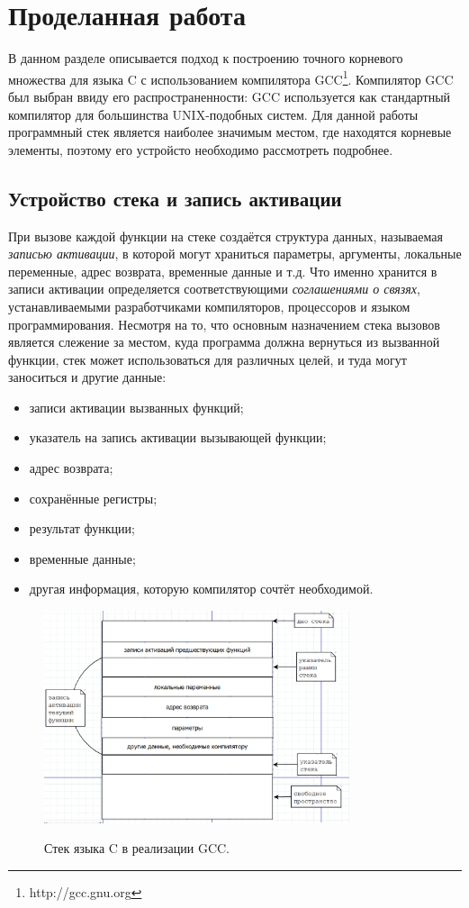 \documentclass{matmex-diploma}
\begin{document}
\section{Проделанная работа}
В данном разделе описывается подход к построению точного корневого множества для языка C с использованием компилятора GCC\footnote{http://gcc.gnu.org}. Компилятор GCC был выбран ввиду его распространенности: GCC используется как стандартный компилятор для большинства UNIX-подобных систем. Для данной работы программный стек является наиболее значимым местом, где находятся корневые элементы, поэтому его устройсто необходимо рассмотреть подробнее.\\

\subsection{Устройство стека и запись активации}
При вызове каждой функции на стеке создаётся структура данных, называемая \textit{записью активации}, в которой могут храниться параметры, аргументы, локальные переменные, адрес возврата, временные данные и т.д. Что именно хранится в записи активации определяется соответствующими \textit{соглашениями о связях}, устанавливаемыми разработчиками компиляторов, процессоров и языком программирования. Несмотря на то, что основным назначением стека вызовов является слежение за местом, куда программа должна вернуться из вызванной функции, стек может использоваться для различных целей, и туда могут заноситься и другие данные:
\begin{itemize}
\item записи активации вызванных функций;
\item указатель на запись активации вызывающей функции;
\item адрес возврата;
\item сохранённые регистры;
\item результат функции;
\item временные данные;
\item другая информация, которую компилятор сочтёт необходимой.
\end{itemize}

\begin{figure}[h]
\centering
\includegraphics[width=0.8\textwidth]{StackFrameC.png}\\
\caption{Стек языка C в реализации GCC.}
\end{figure}
\end{document}
